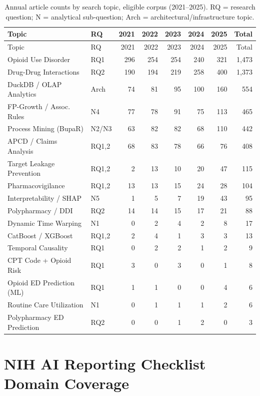 \documentclass[
  12pt,
]{book}
\begin{document}
\begin{longtable}[]{@{}llrrrrrr@{}}
\caption{Annual article counts by search topic, eligible corpus
(2021--2025). RQ = research question; N = analytical sub-question; Arch
= architectural/infrastructure
topic.}\label{tbl-topic-trends}\tabularnewline
\toprule\noalign{}
Topic & RQ & 2021 & 2022 & 2023 & 2024 & 2025 & Total \\
\midrule\noalign{}
\endfirsthead
\toprule\noalign{}
Topic & RQ & 2021 & 2022 & 2023 & 2024 & 2025 & Total \\
\midrule\noalign{}
\endhead
\bottomrule\noalign{}
\endlastfoot
Opioid Use Disorder & RQ1 & 296 & 254 & 254 & 240 & 321 & 1,473 \\
Drug-Drug Interactions & RQ2 & 190 & 194 & 219 & 258 & 400 & 1,373 \\
DuckDB / OLAP Analytics & Arch & 74 & 81 & 95 & 100 & 160 & 554 \\
FP-Growth / Assoc. Rules & N4 & 77 & 78 & 91 & 75 & 113 & 465 \\
Process Mining (BupaR) & N2/N3 & 63 & 82 & 82 & 68 & 110 & 442 \\
APCD / Claims Analysis & RQ1,2 & 68 & 83 & 78 & 66 & 76 & 408 \\
Target Leakage Prevention & RQ1,2 & 2 & 13 & 10 & 20 & 47 & 115 \\
Pharmacovigilance & RQ1,2 & 13 & 13 & 15 & 24 & 28 & 104 \\
Interpretability / SHAP & N5 & 1 & 5 & 7 & 19 & 43 & 95 \\
Polypharmacy / DDI & RQ2 & 14 & 14 & 15 & 17 & 21 & 88 \\
Dynamic Time Warping & N1 & 0 & 2 & 4 & 2 & 8 & 17 \\
CatBoost / XGBoost & RQ1,2 & 2 & 4 & 1 & 3 & 3 & 13 \\
Temporal Causality & RQ1 & 0 & 2 & 2 & 1 & 2 & 9 \\
CPT Code + Opioid Risk & RQ1 & 3 & 0 & 3 & 0 & 1 & 8 \\
Opioid ED Prediction (ML) & RQ1 & 1 & 1 & 0 & 0 & 4 & 6 \\
Routine Care Utilization & N1 & 0 & 1 & 1 & 1 & 2 & 6 \\
Polypharmacy ED Prediction & RQ2 & 0 & 0 & 1 & 2 & 0 & 3 \\
\end{longtable}

\section{NIH AI Reporting Checklist Domain
Coverage}\label{nih-ai-reporting-checklist-domain-coverage}
\end{document}
